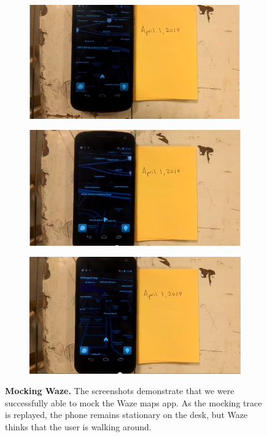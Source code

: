 \begin{figure}[t]

\begin{subfigure}[t]{0.33\textwidth}
\includegraphics[width=\textwidth]{./figures/apps/waze/waze1.png}
\caption{}
\end{subfigure}%
\begin{subfigure}[t]{0.33\textwidth}
\includegraphics[width=\textwidth]{./figures/apps/waze/waze2.png}
\caption{}
\end{subfigure}%
\begin{subfigure}[t]{0.33\textwidth}
\includegraphics[width=\textwidth]{./figures/apps/waze/waze3.png}
\caption{}
\end{subfigure}%

\caption{\textbf{Mocking Waze.} The screenshots demonstrate that we were
successfully able to mock the Waze maps app. As the mocking trace is
replayed, the phone remains stationary on the desk, but Waze thinks that the
user is walking around.}

\label{fig-mocking-waze}

\end{figure}

